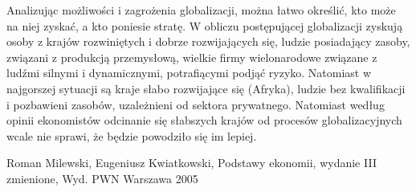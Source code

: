 \documentclass[12pt]{extarticle}
\begin{document}
Analizując możliwości i zagrożenia globalizacji, można łatwo określić, kto może na niej zyskać, a kto poniesie stratę. W obliczu postępującej globalizacji zyskują osoby z krajów rozwiniętych i dobrze rozwijających się, ludzie posiadający zasoby, związani z produkcją przemysłową, wielkie firmy wielonarodowe związane z ludźmi silnymi i dynamicznymi, potrafiącymi podjąć ryzyko. Natomiast w najgorszej sytuacji są kraje słabo rozwijające się (Afryka), ludzie bez kwalifikacji i pozbawieni zasobów, uzależnieni od sektora prywatnego. Natomiast według opinii ekonomistów odcinanie się słabszych krajów od procesów globalizacyjnych wcale nie sprawi, że będzie powodziło się im lepiej.

\begin{thebibliography}{1}

Roman Milewski, Eugeniusz Kwiatkowski, Podstawy ekonomii, wydanie III zmienione, Wyd. PWN Warszawa 2005

\end{thebibliography}
\end{document}
